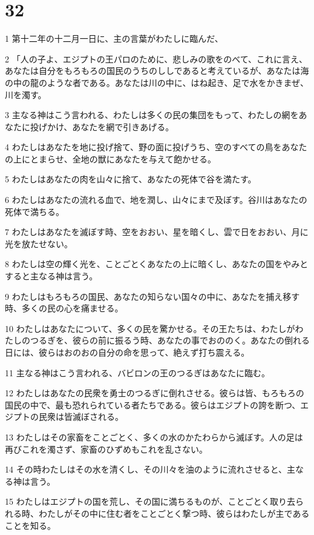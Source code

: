 \chapter{32}

\par 1 第十二年の十二月一日に、主の言葉がわたしに臨んだ、
\par 2 「人の子よ、エジプトの王パロのために、悲しみの歌をのべて、これに言え、あなたは自分をもろもろの国民のうちのししであると考えているが、あなたは海の中の龍のような者である。あなたは川の中に、はね起き、足で水をかきまぜ、川を濁す。
\par 3 主なる神はこう言われる、わたしは多くの民の集団をもって、わたしの網をあなたに投げかけ、あなたを網で引きあげる。
\par 4 わたしはあなたを地に投げ捨て、野の面に投げうち、空のすべての鳥をあなたの上にとまらせ、全地の獣にあなたを与えて飽かせる。
\par 5 わたしはあなたの肉を山々に捨て、あなたの死体で谷を満たす。
\par 6 わたしはあなたの流れる血で、地を潤し、山々にまで及ぼす。谷川はあなたの死体で満ちる。
\par 7 わたしはあなたを滅ぼす時、空をおおい、星を暗くし、雲で日をおおい、月に光を放たせない。
\par 8 わたしは空の輝く光を、ことごとくあなたの上に暗くし、あなたの国をやみとすると主なる神は言う。
\par 9 わたしはもろもろの国民、あなたの知らない国々の中に、あなたを捕え移す時、多くの民の心を痛ませる。
\par 10 わたしはあなたについて、多くの民を驚かせる。その王たちは、わたしがわたしのつるぎを、彼らの前に振るう時、あなたの事でおののく。あなたの倒れる日には、彼らはおのおの自分の命を思って、絶えず打ち震える。
\par 11 主なる神はこう言われる、バビロンの王のつるぎはあなたに臨む。
\par 12 わたしはあなたの民衆を勇士のつるぎに倒れさせる。彼らは皆、もろもろの国民の中で、最も恐れられている者たちである。彼らはエジプトの誇を断つ、エジプトの民衆は皆滅ぼされる。
\par 13 わたしはその家畜をことごとく、多くの水のかたわらから滅ぼす。人の足は再びこれを濁さず、家畜のひずめもこれを乱さない。
\par 14 その時わたしはその水を清くし、その川々を油のように流れさせると、主なる神は言う。
\par 15 わたしはエジプトの国を荒し、その国に満ちるものが、ことごとく取り去られる時、わたしがその中に住む者をことごとく撃つ時、彼らはわたしが主であることを知る。
